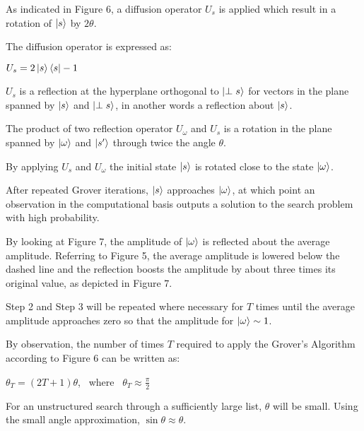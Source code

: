 \documentclass{article}
\begin{document}
\noindent
As indicated in Figure 6, a diffusion operator $U_s$ is applied which result in a rotation of $\ket{s}$ by $2\theta$. 
\vspace{5mm}

\noindent
The diffusion operator is expressed as:
\vspace{5mm}

\qquad $U_s  = 2 \ket{s}\bra{s} - 1$
\vspace{5mm}

\noindent
$U_s$ is a reflection at the hyperplane orthogonal to $\ket{\perp s}$  for vectors in the plane spanned by $\ket{s}$  and $\ket{\perp s}$, in another words a reflection about $\ket{s}$. 
\vspace{5mm}

\noindent
The product of two reflection operator $U_\omega$ and $U_s$ is a rotation in the plane spanned by $\ket{\omega}$ and $\ket{s'}$ through twice the angle $\theta$.
\vspace{5mm}

\noindent
By applying $U_s$ and $U_\omega$ the initial state $\ket{s}$ is rotated close to the state $\ket{\omega}$.
\vspace{5mm}

\noindent
After repeated Grover iterations, $\ket{s}$ approaches $\ket{\omega}$, at which point an observation in the computational basis
outputs a solution to the search problem with high probability.
\vspace{5mm}

\noindent
By looking at Figure 7, the amplitude of $\ket{\omega}$ is reflected about the average amplitude. Referring to Figure 5, the average amplitude is lowered below the dashed line and the reflection boosts the amplitude by about three times its original value, as depicted in Figure 7.
\pagebreak

\noindent
Step 2 and Step 3 will be repeated where necessary for $T$ times until the average amplitude approaches zero so that the amplitude for $\ket{\omega} \sim 1$.
\vspace{5mm}

\noindent
By observation, the number of times $T$ required to apply the Grover's Algorithm according to Figure 6 can be written as:
\vspace{5mm}

\noindent
\qquad $\theta_T = (2T + 1)\theta$, \ where \ $\theta_T \approx \frac{\pi}{2}$  
\vspace{5mm}

\noindent
For an unstructured search through a sufficiently large list, $\theta$ will be small. Using the small angle approximation, $\sin\theta \approx \theta$. 
\vspace{5mm}
\end{document}
